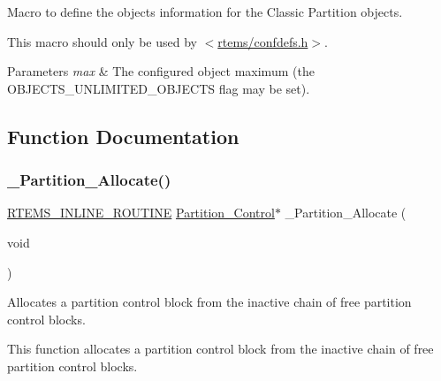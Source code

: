 Macro to define the objects information for the Classic Partition objects. 

This macro should only be used by $<$\mbox{\hyperlink{confdefs_8h}{rtems/confdefs.\+h}}$>$.


\begin{DoxyParams}{Parameters}
{\em max} & The configured object maximum (the O\+B\+J\+E\+C\+T\+S\+\_\+\+U\+N\+L\+I\+M\+I\+T\+E\+D\+\_\+\+O\+B\+J\+E\+C\+TS flag may be set). \\
\hline
\end{DoxyParams}


\subsection{Function Documentation}
\mbox{\label{group__ClassicPartImpl_gaf0cd3ef551cee15f50523308fa63aeed}} 
\subsubsection{\texorpdfstring{\_Partition\_Allocate()}{\_Partition\_Allocate()}}
{\footnotesize\ttfamily \mbox{\hyperlink{group__RTEMSScoreBaseDefs_gac216239df231d5dbd15e3520b0b9313f}{R\+T\+E\+M\+S\+\_\+\+I\+N\+L\+I\+N\+E\+\_\+\+R\+O\+U\+T\+I\+NE}} \mbox{\hyperlink{structPartition__Control}{Partition\+\_\+\+Control}}$\ast$ \+\_\+\+Partition\+\_\+\+Allocate (\begin{DoxyParamCaption}\item[{void}]{ }\end{DoxyParamCaption})}



Allocates a partition control block from the inactive chain of free partition control blocks. 

This function allocates a partition control block from the inactive chain of free partition control blocks. \mbox{\label{group__ClassicPartImpl_ga71de1566df69f6963e4e51098c1c4e23}} 
